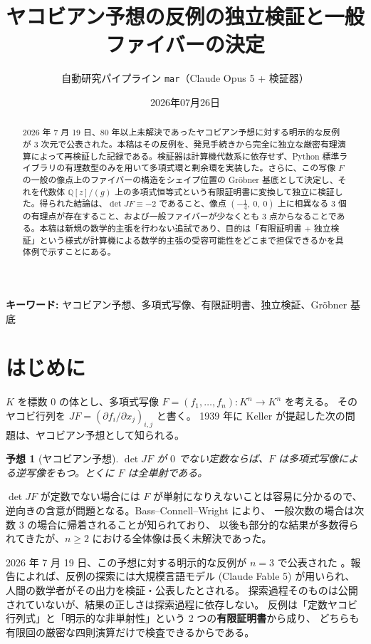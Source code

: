 \documentclass[paper=a4,fontsize=10.5pt,jafontsize=10.5pt]{jlreq}
\title{ヤコビアン予想の反例の独立検証と一般ファイバーの決定}
\author{自動研究パイプライン \texttt{mar}（Claude Opus 5 + 検証器）}
\date{2026年07月26日}
\theoremstyle{plain}
\newtheorem{conjecture}[theorem]{予想}
\theoremstyle{definition}
\begin{document}
\maketitle

\begin{abstract}
2026 年 7 月 19 日、80 年以上未解決であったヤコビアン予想に対する明示的な反例が 3 次元で公表された。本稿はその反例を、発見手続きから完全に独立な厳密有理演算によって再検証した記録である。検証器は計算機代数系に依存せず、Python 標準ライブラリの有理数型のみを用いて多項式環と剰余環を実装した。さらに、この写像 $F$ の一般の像点上のファイバーの構造をシェイプ位置の Gr\"obner 基底として決定し、それを代数体 $\mathbb{Q}[z]/(g)$ 上の多項式恒等式という有限証明書に変換して独立に検証した。得られた結論は、$\det JF \equiv -2$ であること、像点 $(-\frac{1}{4},\ 0,\ 0)$ 上に相異なる 3 個の有理点が存在すること、および一般ファイバーが少なくとも 3 点からなることである。本稿は新規の数学的主張を行わない追試であり、目的は「有限証明書 + 独立検証」という様式が計算機による数学的主張の受容可能性をどこまで担保できるかを具体例で示すことにある。
\end{abstract}

\noindent\textbf{キーワード:} ヤコビアン予想、多項式写像、有限証明書、独立検証、Gr\"obner 基底


\section{はじめに}

$K$ を標数 $0$ の体とし、多項式写像 $F = (f_1,\dots,f_n)\colon K^n \to K^n$ を考える。
そのヤコビ行列を $JF = (\partial f_i/\partial x_j)_{i,j}$ と書く。
1939 年に Keller \cite{keller1939} が提起した次の問題は、ヤコビアン予想として知られる。

\begin{conjecture}[ヤコビアン予想]
$\det JF$ が $0$ でない定数ならば、$F$ は多項式写像による逆写像をもつ。とくに $F$ は全単射である。
\end{conjecture}

$\det JF$ が定数でない場合には $F$ が単射になりえないことは容易に分かるので、
逆向きの含意が問題となる。Bass--Connell--Wright \cite{bcw1982} により、
一般次数の場合は次数 $3$ の場合に帰着されることが知られており、
以後も部分的な結果が多数得られてきたが、$n \ge 2$ における全体像は長く未解決であった。

2026 年 7 月 19 日、この予想に対する明示的な反例が $n = 3$ で公表された
\cite{wiki-jacobian, newscientist-2026}。報告によれば、反例の探索には大規模言語モデル
(Claude Fable 5) が用いられ、人間の数学者がその出力を検証・公表したとされる。
探索過程そのものは公開されていないが、結果の正しさは探索過程に依存しない。
反例は「定数ヤコビ行列式」と「明示的な非単射性」という 2 つの\textbf{有限証明書}から成り、
どちらも有限回の厳密な四則演算だけで検査できるからである。
\end{document}
